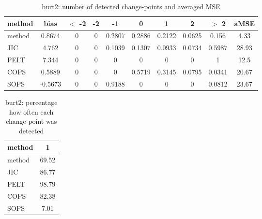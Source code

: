 \begin{table}[ht]
\centering
\begin{tabular}{l|c|ccccccc|c}
  \hline
method & bias & $<$ -2 & -2 & -1 & 0 & 1 & 2 & $>$ 2 & aMSE \\ 
  \hline
method & 0.8674 &     0 &     0 & 0.2807 & 0.2886 & 0.2122 & 0.0625 & 0.156 &  4.33 \\ 
  JIC & 4.762 &     0 &     0 & 0.1039 & 0.1307 & 0.0933 & 0.0734 & 0.5987 & 28.93 \\ 
  PELT & 7.344 &     0 &     0 &     0 &     0 &     0 &     0 &     1 &  12.5 \\ 
  COPS & 0.5889 &     0 &     0 &     0 & 0.5719 & 0.3145 & 0.0795 & 0.0341 & 20.67 \\ 
  SOPS & -0.5673 &     0 &     0 & 0.9188 &     0 &     0 &     0 & 0.0812 & 23.67 \\ 
   \hline
\end{tabular}
\caption{burt2: number of detected change-points and averaged MSE} 
\label{tab:burt2Njumps}
\end{table}
\begin{table}[ht]
\centering
\begin{tabular}{l|c}
  \hline
method & 1 \\ 
  \hline
method &  69.52 \\ 
  JIC &  86.77 \\ 
  PELT &  98.79 \\ 
  COPS &  82.38 \\ 
  SOPS &   7.01 \\ 
   \hline
\end{tabular}
\caption{burt2: percentage how often each change-point was detected} 
\label{tab:burt2Detections}
\end{table}

